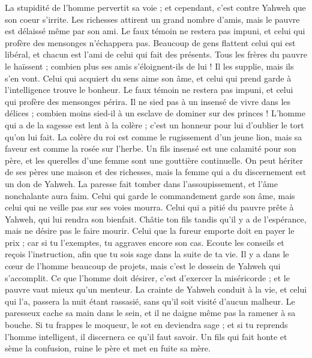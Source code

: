 \begin{multicols}{2}
La stupidité de l'homme pervertit sa voie ; et cependant, c'est contre Yahweh que son coeur s'irrite.
Les richesses attirent un grand nombre d'amis, mais le pauvre est délaissé même par son ami.
Le faux témoin ne restera pas impuni, et celui qui profère des mensonges n'échappera pas.
Beaucoup de gens flattent celui qui est libéral, et chacun est l'ami de celui qui fait des présents.
Tous les frères du pauvre le haïssent ; combien plus ses amis s'éloignent-ils de lui ! Il les supplie, mais ils s'en vont.
Celui qui acquiert du sens aime son âme, et celui qui prend garde à l'intelligence trouve le bonheur.
Le faux témoin ne restera pas impuni, et celui qui profère des mensonges périra.
Il ne sied pas à un insensé de vivre dans les délices ; combien moins sied-il à un esclave de dominer sur des princes !
L'homme qui a de la sagesse est lent à la colère ; c'est un honneur pour lui d'oublier le tort qu'on lui fait.
La colère du roi est comme le rugissement d'un jeune lion, mais sa faveur est comme la rosée sur l'herbe.
Un fils insensé est une calamité pour son père, et les querelles d'une femme sont une gouttière continuelle.
On peut hériter de ses pères une maison et des richesses, mais la femme qui a du discernement est un don de Yahweh.
La paresse fait tomber dans l'assoupissement, et l'âme nonchalante aura faim.
Celui qui garde le commandement garde son âme, mais celui qui ne veille pas sur ses voies mourra.
Celui qui a pitié du pauvre prête à Yahweh, qui lui rendra son bienfait.
Châtie ton fils tandis qu'il y a de l'espérance, mais ne désire pas le faire mourir.
Celui que la fureur emporte doit en payer le prix ; car si tu l'exemptes, tu aggraves encore son cas.
Ecoute les conseils et reçois l'instruction, afin que tu sois sage dans la suite de ta vie.
Il y a dans le cœur de l'homme beaucoup de projets, mais c'est le dessein de Yahweh qui s'accomplit.
Ce que l'homme doit désirer, c'est d'exercer la miséricorde ; et le pauvre vaut mieux qu'un menteur.
La crainte de Yahweh conduit à la vie, et celui qui l'a, passera la nuit étant rassasié, sans qu'il soit visité d'aucun malheur.
Le paresseux cache sa main dans le sein, et il ne daigne même pas la ramener à sa bouche.
Si tu frappes le moqueur, le sot en deviendra sage ; et si tu reprends l'homme intelligent, il discernera ce qu'il faut savoir.
Un fils qui fait honte et sème la confusion, ruine le père et met en fuite sa mère.

\end{multicols}
